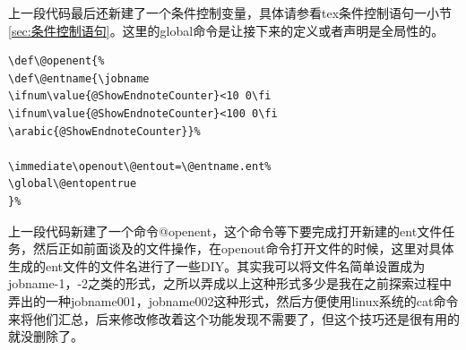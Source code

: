 \documentclass[12pt,oneside]{book}
\begin{document}
\begin{common-format}
上一段代码最后还新建了一个条件控制变量，具体请参看tex条件控制语句一小节\ref{sec:条件控制语句}。这里的global命令是让接下来的定义或者声明是全局性的。

\begin{Verbatim}
\def\@openent{%
\def\@entname{\jobname
\ifnum\value{@ShowEndnoteCounter}<10 0\fi
\ifnum\value{@ShowEndnoteCounter}<100 0\fi
\arabic{@ShowEndnoteCounter}}%

\immediate\openout\@entout=\@entname.ent%
\global\@entopentrue
}%
\end{Verbatim}
上一段代码新建了一个命令@openent，这个命令等下要完成打开新建的ent文件任务，然后正如前面谈及的文件操作，在openout命令打开文件的时候，这里对具体生成的ent文件的文件名进行了一些DIY。其实我可以将文件名简单设置成为jobname-1，-2之类的形式，之所以弄成以上这种形式多少是我在之前探索过程中弄出的一种jobname001，jobname002这种形式，然后方便使用linux系统的cat命令来将他们汇总，后来修改修改着这个功能发现不需要了，但这个技巧还是很有用的就没删除了。


\end{common-format}
\end{document}
